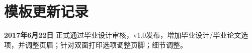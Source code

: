 \chapter{模板更新记录}
\label{chap:updatelog}
\textbf{2017年6月22日} \nuaathesis 正式通过毕业设计审核，v1.0发布，增加毕业设计/毕业论文选项，并调整页眉；针对双面打印选项调整页脚；细节调整。

